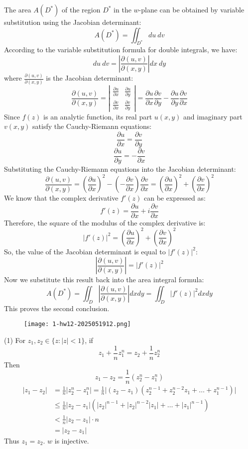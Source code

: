 The area $A(D^*)$ of the region $D^*$ in the $w$-plane can be obtained by variable substitution using the Jacobian determinant:
\[
A(D^*) = \iint_{D^*} du\ dv
\]
According to the variable substitution formula for double integrals, we have:
\[
du\ dv = \left| \frac{\partial(u,v)}{\partial(x,y)} \right| dx\ dy
\]
where $\frac{\partial(u,v)}{\partial(x,y)}$ is the Jacobian determinant:
\[
\frac{\partial(u,v)}{\partial(x,y)} = \left| \begin{array}{cc} \frac{\partial u}{\partial x} & \frac{\partial u}{\partial y} \\ \frac{\partial v}{\partial x} & \frac{\partial v}{\partial y} \end{array} \right| = \frac{\partial u}{\partial x} \frac{\partial v}{\partial y} - \frac{\partial u}{\partial y} \frac{\partial v}{\partial x}
\]
Since $f(z)$ is an analytic function, its real part $u(x,y)$ and imaginary part $v(x,y)$ satisfy the Cauchy-Riemann equations:
\[
\frac{\partial u}{\partial x} = \frac{\partial v}{\partial y}
\]
\[
\frac{\partial u}{\partial y} = -\frac{\partial v}{\partial x}
\]
Substituting the Cauchy-Riemann equations into the Jacobian determinant:
\[
\frac{\partial(u,v)}{\partial(x,y)} = \left( \frac{\partial u}{\partial x} \right)^2 - \left( -\frac{\partial v}{\partial x} \right) \frac{\partial v}{\partial x} = \left( \frac{\partial u}{\partial x} \right)^2 + \left( \frac{\partial v}{\partial x} \right)^2
\]
We know that the complex derivative $f'(z)$ can be expressed as:
\[
f'(z) = \frac{\partial u}{\partial x} + i \frac{\partial v}{\partial x}
\]
Therefore, the square of the modulus of the complex derivative is:
\[
|f'(z)|^2 = \left( \frac{\partial u}{\partial x} \right)^2 + \left( \frac{\partial v}{\partial x} \right)^2
\]
So, the value of the Jacobian determinant is equal to $|f'(z)|^2$:
\[
\left| \frac{\partial(u,v)}{\partial(x,y)} \right| = |f'(z)|^2
\]
Now we substitute this result back into the area integral formula:
\[
A(D^*)=\iint_D\left|\frac{\partial(u,v)}{\partial(x,y)}\right|dxdy=\iint_D|f'(z)|^2dxdy
\]
This proves the second conclusion.

\begin{exercise}
\begin{figure}[H]
\centering
\texttt{[image: 1-hw12-2025051912.png]}
\label{}
\end{figure}
\end{exercise}
(1)
For $z_1, z_2\in \{ z:\lvert z \rvert<1 \}$, if
\[
z_1+\frac{1}{n}z_1^{n}=z_2+\frac{1}{n}z_2^{n}
\]
Then
\[
z_1-z_2=\frac{1}{n}(z_2^{n}-z_1^{n})
\]
\[
\begin{aligned}
\lvert z_1-z_2 \rvert &  =\frac{1}{n}\lvert z_2^{n}-z_1^{n} \rvert =\frac{1}{n}\lvert (z_2-z_1)(z_2^{n-1}+z_2^{n-2}z_1+\dots+z_1^{n-1}) \rvert  \\
 & \leq \frac{1}{n}\lvert z_2-z_1 \rvert (\lvert z_2 \rvert ^{n-1}+\lvert z_2 \rvert ^{n-2}\lvert z_1 \rvert +\dots+\lvert z_1 \rvert ^{n-1}) \\
 & <\frac{1}{n}\lvert z_2-z_1 \rvert \cdot n  \\
 & =\lvert z_2-z_1 \rvert  
\end{aligned}
\]
Thus $z_1=z_2$. $w$ is injective.

